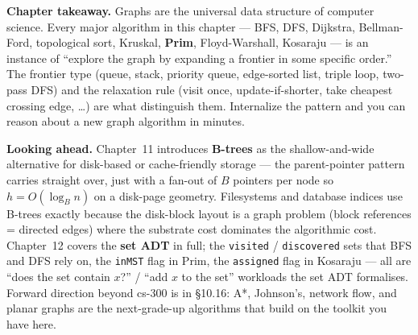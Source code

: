 \documentclass[11pt]{article}
\begin{document}
\begin{ideabox}
\textbf{Chapter takeaway.} Graphs are the universal data structure
of computer science. Every major algorithm in this chapter --- BFS,
DFS, Dijkstra, Bellman-Ford, topological sort, Kruskal,
\textbf{Prim}, Floyd-Warshall, Kosaraju --- is an instance of
``explore the graph by expanding a frontier in some specific
order.'' The frontier type (queue, stack, priority queue,
edge-sorted list, triple loop, two-pass DFS) and the relaxation
rule (visit once, update-if-shorter, take cheapest crossing edge,
\dots) are what distinguish them. Internalize the pattern and you
can reason about a new graph algorithm in minutes.

\textbf{Looking ahead.} Chapter~11 introduces \textbf{B-trees} as
the shallow-and-wide alternative for disk-based or cache-friendly
storage --- the parent-pointer pattern carries straight over, just
with a fan-out of $B$ pointers per node so $h = O(\log_B n)$ on a
disk-page geometry. Filesystems and database indices use B-trees
exactly because the disk-block layout is a graph problem (block
references = directed edges) where the substrate cost dominates
the algorithmic cost. Chapter~12 covers the \textbf{set ADT} in
full; the \texttt{visited} / \texttt{discovered} sets that BFS and
DFS rely on, the \texttt{inMST} flag in Prim, the
\texttt{assigned} flag in Kosaraju --- all are
``does the set contain $x$?'' / ``add $x$ to the set'' workloads
the set ADT formalises. Forward direction beyond cs-300 is in
\S10.16: A*, Johnson's, network flow, and planar graphs are the
next-grade-up algorithms that build on the toolkit you have here.
\end{ideabox}
\end{document}
